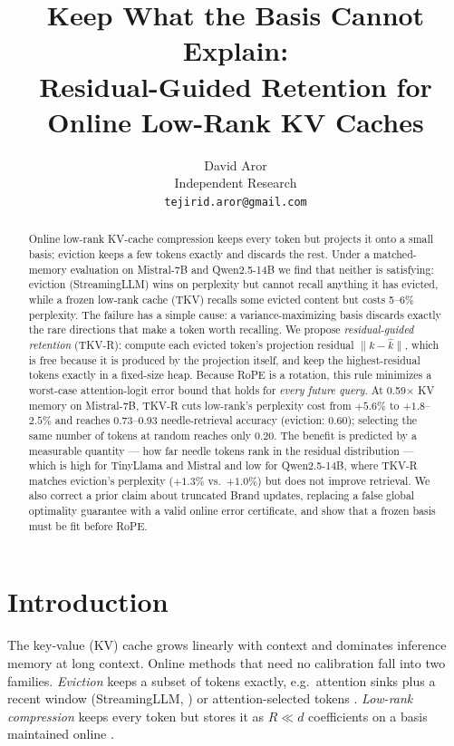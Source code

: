 \documentclass{article}
\title{\textbf{Keep What the Basis Cannot Explain:\\
Residual-Guided Retention for Online Low-Rank KV Caches}}
\author{
  David Aror \\
  Independent Research \\
  \texttt{tejirid.aror@gmail.com}
}
\date{}
\begin{document}
\ifcolmsubmission
\linenumbers
\fi

\maketitle

\begin{abstract}
Online low-rank KV-cache compression keeps every token but projects it onto a
small basis; eviction keeps a few tokens exactly and discards the rest. Under a
matched-memory evaluation on Mistral-7B and Qwen2.5-14B we find that neither is
satisfying: eviction (StreamingLLM) wins on perplexity but cannot recall
anything it has evicted, while a frozen low-rank cache (TKV) recalls some
evicted content but costs 5--6\% perplexity. The failure has a simple cause:
a variance-maximizing basis discards exactly the rare directions that make a
token worth recalling. We propose \emph{residual-guided retention} (TKV-R):
compute each evicted token's projection residual $\lVert k - \hat k\rVert$,
which is free because it is produced by the projection itself, and keep the
highest-residual tokens exactly in a fixed-size heap. Because RoPE is a
rotation, this rule minimizes a worst-case attention-logit error bound that
holds for \emph{every future query}. At 0.59$\times$ KV memory on Mistral-7B,
TKV-R cuts low-rank's perplexity cost from $+5.6\%$ to $+1.8$--$2.5\%$ and
reaches 0.73--0.93 needle-retrieval accuracy (eviction: 0.60); selecting the
same number of tokens at random reaches only 0.20. The benefit is predicted by
a measurable quantity --- how far needle tokens rank in the residual
distribution --- which is high for TinyLlama and Mistral and low for
Qwen2.5-14B, where TKV-R matches eviction's perplexity ($+1.3\%$ vs.\
$+1.0\%$) but does not improve retrieval. We also correct a prior claim about
truncated Brand updates, replacing a false global optimality guarantee with a
valid online error certificate, and show that a frozen basis must be fit
before RoPE.
\end{abstract}

\section{Introduction}
\label{sec:intro}

The key-value (KV) cache grows linearly with context and dominates inference
memory at long context. Online methods that need no calibration fall into two
families. \emph{Eviction} keeps a subset of tokens exactly, e.g.\ attention
sinks plus a recent window (StreamingLLM, \citealp{streamingllm2023}) or
attention-selected tokens \citep{h2o2023,snapkv2024}. \emph{Low-rank
compression} keeps every token but stores it as $R \ll d$ coefficients on a
basis maintained online \citep{ojakov2025}.
\end{document}
